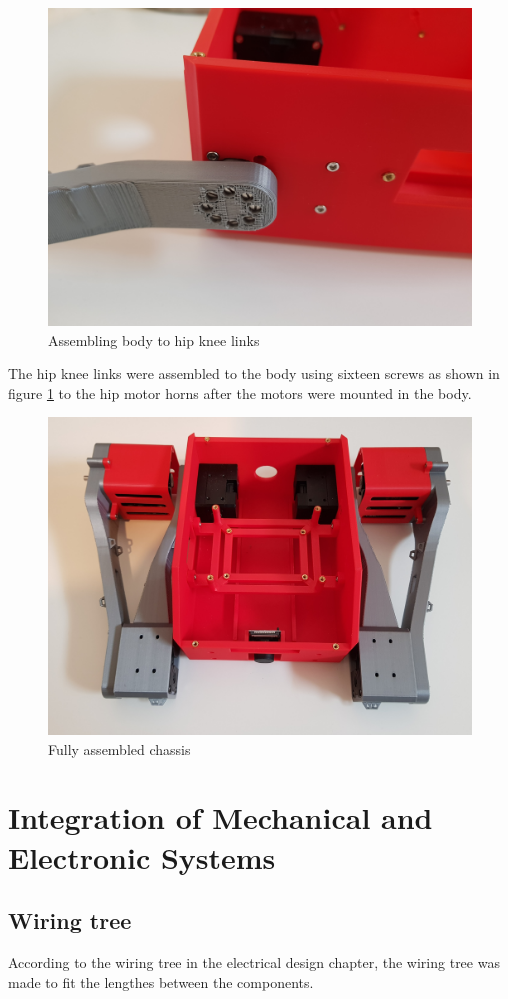 \newpage
\begin{figure}[h]
	\centering
	\includegraphics[width=0.5\linewidth]{assembling_body_hip_knee_links}
	\caption{Assembling body to hip knee links}
	\label{fig:assemblingbodyhipkneelinks}
\end{figure}
The hip knee links were assembled to the body using sixteen screws as shown in figure \ref{fig:assemblingbodyhipkneelinks} to the hip motor horns after the motors were mounted in the body.
\begin{figure}[h]
	\centering
	\includegraphics[width=0.5\linewidth]{fully_assembled_chassis}
	\caption{Fully assembled chassis}
	\label{fig:fullyassembledchassis}
\end{figure}

\section{Integration of Mechanical and Electronic Systems}


\subsection{Wiring tree}
According to the wiring tree in the electrical design chapter, the wiring tree was made to fit the lengthes between the components.
%


